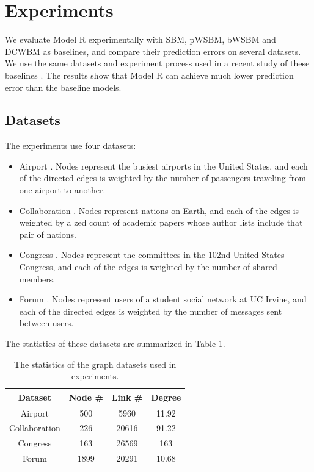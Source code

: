\documentclass[book,12pt]{WSUThesis}
\theoremstyle{definition}
\begin{document}
\section{Experiments} \label{section:experiments}
We evaluate Model R experimentally with SBM, pWSBM, bWSBM and DCWBM as baselines,
and compare their prediction errors on several datasets.
We use the same datasets and experiment process used in a recent study of these baselines \cite{aicher2014learning}.
The results show 
that Model R can achieve much lower prediction error than the baseline models.

\subsection{Datasets}
The experiments use four datasets:
\begin{itemize}
	\item Airport \cite{colizza2007reaction}. Nodes represent the busiest airports in the United States, and each of the directed edges is weighted by the number of passengers traveling from one airport to another.
	\item Collaboration \cite{pan2012world}. Nodes represent nations on Earth, and each of the edges	is weighted by a zed count of academic papers whose author lists include that pair of nations.
	\item Congress \cite{porter2005network}. Nodes represent the committees in the 102nd United States Congress, and each of the edges is weighted by the number of shared members.
	\item Forum \cite{opsahl2009clustering}. Nodes represent users of a student social network at UC Irvine, and each of the directed edges is weighted by the number of messages sent between users.
\end{itemize}
The statistics of these datasets are summarized in Table \ref{tab:datasets}.
\begin{table}[!ht]\centering
	\caption{The statistics of the graph datasets used in experiments.}
	\begin{tabular}{cccc} \hline \rowcolor{blue!30}
		Dataset & Node \# & Link \# & Degree \\ \hline
		Airport & 500 & 5960 & 11.92 \\ \hline
		Collaboration & 226 & 20616 & 91.22 \\ \hline
		Congress & 163 & 26569 & 163 \\ \hline
		Forum  & 1899 & 20291 & 10.68 \\ \hline
	\end{tabular}
	\label{tab:datasets}
\end{table}
\end{document}
